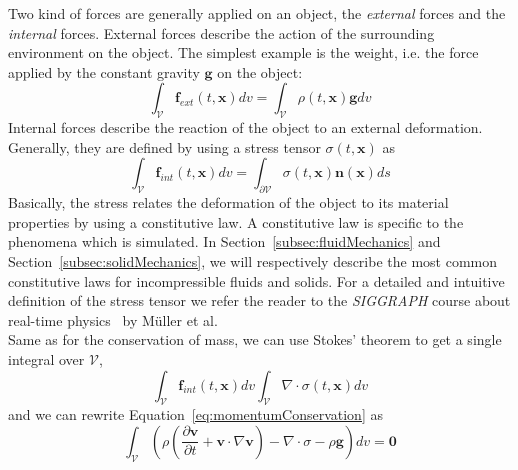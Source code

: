 Two kind of forces are generally applied on an object, the \emph{external} forces and the \emph{internal} forces.
External forces describe the action of the surrounding environment on the object. 
The simplest example is the weight, i.e. the force applied by the constant gravity $\mathbf{g}$ on the object:
\begin{equation}
\label{eq:externalForces}
\displaystyle \int_{\mathcal{V}} \mathbf{f}_{ext}(t,\mathbf{x})dv = \int_{\mathcal{V}} \rho(t,\mathbf{x}) \mathbf{g} dv
\end{equation}
Internal forces describe the reaction of the object to an external deformation.
Generally, they are defined by using a stress tensor $\sigma(t,\mathbf{x})$ as 
\begin{equation}
\displaystyle 
\int_{\mathcal{V}} \mathbf{f}_{int}(t,\mathbf{x}) dv 
= \int_{\partial \mathcal{V}} \sigma(t,\mathbf{x}) \mathbf{n}(\mathbf{x}) ds
\end{equation}
Basically, the stress relates the deformation of the object to its material properties by using a constitutive law.
A constitutive law is specific to the phenomena which is simulated.
In Section~\ref{subsec:fluidMechanics} and Section~\ref{subsec:solidMechanics}, we will respectively describe the most common constitutive laws for incompressible fluids and solids.
For a detailed and intuitive definition of the stress tensor we refer the reader to the \emph{SIGGRAPH} course about real-time physics~\cite{Muller2008} by M\"{u}ller et al.
\\
Same as for the conservation of mass, we can use Stokes' theorem to get a single integral over $\mathcal{V}$,
\begin{equation}
\label{eq:internalForces}
\displaystyle 
\int_{\mathcal{V}} \mathbf{f}_{int}\left(t,\mathbf{x}\right) dv 
\int_{\mathcal{V}} \nabla \cdot \sigma\left(t,\mathbf{x}\right) dv
\end{equation}
and we can rewrite Equation~\eqref{eq:momentumConservation} as
\begin{equation}
\label{eq:volumetricMomentumConservation}
\displaystyle
\int_{\mathcal{V}} 
\left( 
\rho \left( \frac{\partial\mathbf{v}}{\partial t} + \mathbf{v} \cdot \nabla \mathbf{v} \right)
- \nabla \cdot \sigma - \rho \mathbf{g}  \right) dv = \mathbf{0}
\end{equation}

